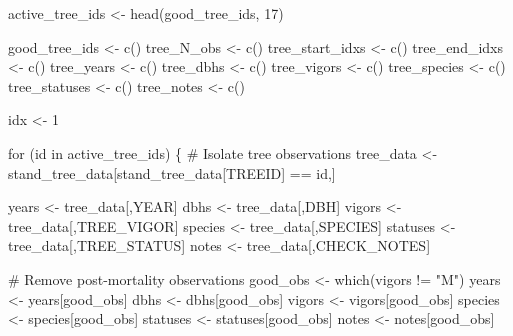\documentclass[
  letterpaper,
  DIV=11,
  numbers=noendperiod]{scrartcl}
\newenvironment{Shaded}{\begin{snugshade}}{\end{snugshade}}
\newcommand{\CommentTok}[1]{\textcolor[rgb]{0.37,0.37,0.37}{#1}}
\newcommand{\ControlFlowTok}[1]{\textcolor[rgb]{0.00,0.23,0.31}{#1}}
\newcommand{\DecValTok}[1]{\textcolor[rgb]{0.68,0.00,0.00}{#1}}
\newcommand{\FunctionTok}[1]{\textcolor[rgb]{0.28,0.35,0.67}{#1}}
\newcommand{\NormalTok}[1]{\textcolor[rgb]{0.00,0.23,0.31}{#1}}
\newcommand{\OtherTok}[1]{\textcolor[rgb]{0.00,0.23,0.31}{#1}}
\newcommand{\SpecialCharTok}[1]{\textcolor[rgb]{0.37,0.37,0.37}{#1}}
\newcommand{\StringTok}[1]{\textcolor[rgb]{0.13,0.47,0.30}{#1}}
\begin{document}
\begin{Shaded}
\begin{Highlighting}[]
\NormalTok{active\_tree\_ids }\OtherTok{\textless{}{-}} \FunctionTok{head}\NormalTok{(good\_tree\_ids, }\DecValTok{17}\NormalTok{)}

\NormalTok{good\_tree\_ids }\OtherTok{\textless{}{-}} \FunctionTok{c}\NormalTok{()}
\NormalTok{tree\_N\_obs }\OtherTok{\textless{}{-}} \FunctionTok{c}\NormalTok{()}
\NormalTok{tree\_start\_idxs }\OtherTok{\textless{}{-}} \FunctionTok{c}\NormalTok{()}
\NormalTok{tree\_end\_idxs }\OtherTok{\textless{}{-}} \FunctionTok{c}\NormalTok{()}
\NormalTok{tree\_years }\OtherTok{\textless{}{-}} \FunctionTok{c}\NormalTok{()}
\NormalTok{tree\_dbhs }\OtherTok{\textless{}{-}} \FunctionTok{c}\NormalTok{()}
\NormalTok{tree\_vigors }\OtherTok{\textless{}{-}} \FunctionTok{c}\NormalTok{()}
\NormalTok{tree\_species }\OtherTok{\textless{}{-}} \FunctionTok{c}\NormalTok{()}
\NormalTok{tree\_statuses }\OtherTok{\textless{}{-}} \FunctionTok{c}\NormalTok{()}
\NormalTok{tree\_notes }\OtherTok{\textless{}{-}} \FunctionTok{c}\NormalTok{()}

\NormalTok{idx }\OtherTok{\textless{}{-}} \DecValTok{1}

\ControlFlowTok{for}\NormalTok{ (id }\ControlFlowTok{in}\NormalTok{ active\_tree\_ids) \{}
  \CommentTok{\# Isolate tree observations}
\NormalTok{  tree\_data }\OtherTok{\textless{}{-}}\NormalTok{ stand\_tree\_data[stand\_tree\_data[}\StringTok{\textquotesingle{}TREEID\textquotesingle{}}\NormalTok{] }\SpecialCharTok{==}\NormalTok{ id,]}

\NormalTok{  years }\OtherTok{\textless{}{-}}\NormalTok{ tree\_data[,}\StringTok{\textquotesingle{}YEAR\textquotesingle{}}\NormalTok{]}
\NormalTok{  dbhs }\OtherTok{\textless{}{-}}\NormalTok{ tree\_data[,}\StringTok{\textquotesingle{}DBH\textquotesingle{}}\NormalTok{]}
\NormalTok{  vigors }\OtherTok{\textless{}{-}}\NormalTok{ tree\_data[,}\StringTok{\textquotesingle{}TREE\_VIGOR\textquotesingle{}}\NormalTok{]}
\NormalTok{  species }\OtherTok{\textless{}{-}}\NormalTok{ tree\_data[,}\StringTok{\textquotesingle{}SPECIES\textquotesingle{}}\NormalTok{]}
\NormalTok{  statuses }\OtherTok{\textless{}{-}}\NormalTok{ tree\_data[,}\StringTok{\textquotesingle{}TREE\_STATUS\textquotesingle{}}\NormalTok{]}
\NormalTok{  notes }\OtherTok{\textless{}{-}}\NormalTok{ tree\_data[,}\StringTok{\textquotesingle{}CHECK\_NOTES\textquotesingle{}}\NormalTok{]}

  \CommentTok{\# Remove post{-}mortality observations}
\NormalTok{  good\_obs }\OtherTok{\textless{}{-}} \FunctionTok{which}\NormalTok{(vigors }\SpecialCharTok{!=} \StringTok{"M"}\NormalTok{)}
\NormalTok{  years }\OtherTok{\textless{}{-}}\NormalTok{ years[good\_obs]}
\NormalTok{  dbhs }\OtherTok{\textless{}{-}}\NormalTok{ dbhs[good\_obs]}
\NormalTok{  vigors }\OtherTok{\textless{}{-}}\NormalTok{ vigors[good\_obs]}
\NormalTok{  species }\OtherTok{\textless{}{-}}\NormalTok{ species[good\_obs]}
\NormalTok{  statuses }\OtherTok{\textless{}{-}}\NormalTok{ statuses[good\_obs]}
\NormalTok{  notes }\OtherTok{\textless{}{-}}\NormalTok{ notes[good\_obs]}


\end{Highlighting}
\end{Shaded}
\end{document}
